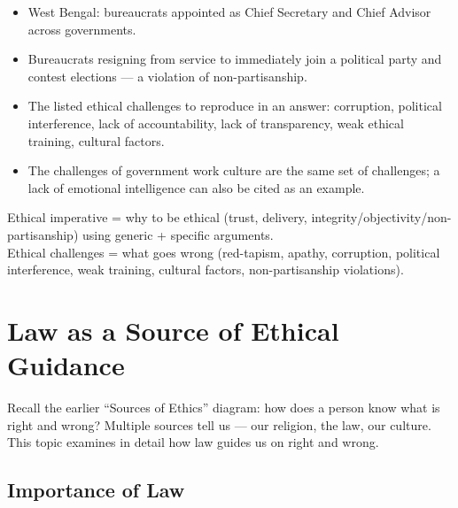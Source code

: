\begin{ExampleBox}
\begin{itemize}
\item West Bengal: bureaucrats appointed as Chief Secretary and Chief Advisor across governments.
\item Bureaucrats resigning from service to immediately join a political party and contest elections --- a violation of non-partisanship.
\end{itemize}
\end{ExampleBox}

\begin{CriticalPoint}
\begin{itemize}
\item The listed ethical challenges to reproduce in an answer: corruption, political interference, lack of accountability, lack of transparency, weak ethical training, cultural factors.
\item The challenges of government work culture are the same set of challenges; a lack of emotional intelligence can also be cited as an example.
\end{itemize}
\end{CriticalPoint}

\begin{QuickRevision}
Ethical imperative = why to be ethical (trust, delivery, integrity/objectivity/non-partisanship) using generic + specific arguments.\\
Ethical challenges = what goes wrong (red-tapism, apathy, corruption, political interference, weak training, cultural factors, non-partisanship violations).
\end{QuickRevision}

\section{Law as a Source of Ethical Guidance}
Recall the earlier ``Sources of Ethics'' diagram: how does a person know what is right and wrong? Multiple sources tell us --- our religion, the law, our culture. This topic examines in detail how law guides us on right and wrong.

\subsection{Importance of Law}

